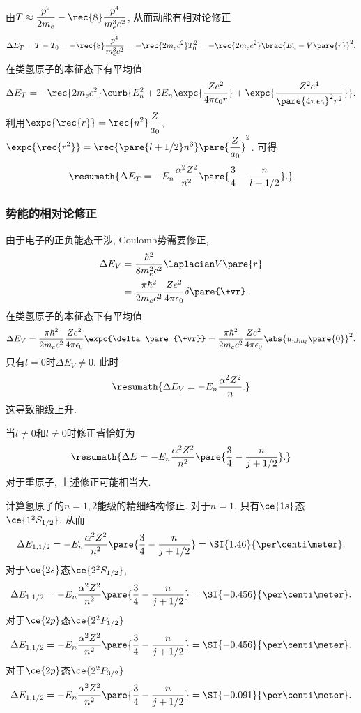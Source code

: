 \documentclass[hidelinks]{ctexart}
\begin{document}
由$\displaystyle T\approx \frac{p^2}{2m_e} - \rec{8} \frac{p^4}{m_e^3 c^2}$, 从而动能有相对论修正
\[ \Delta E_T = T - T_0 = -\rec{8}\frac{p^4}{m_e^3 c^2} = -\rec{2m_e c^2}T_0^2 = -\rec{2m_ec^2}\brac{E_n - V\pare{r}}^2. \]
在类氢原子的本征态下有平均值
\[ \Delta E_T = -\rec{2m_e c^2}\curb{E_n^2 + 2E_n \expc{\frac{Ze^2}{4\pi\epsilon_0 r}} + \expc{\frac{Z^2 e^4}{\pare{4\pi\epsilon_0}^2 r^2}}}. \]
利用$\displaystyle \expc{\rec{r}} = \rec{n^2} \frac{Z}{a_0}$, $\displaystyle \expc{\rec{r^2}} = \rec{\pare{l+1/2}n^3} \pare{\frac{Z}{a_0}}^2$. 可得
\[ \resumath{\Delta E_T = -E_n \frac{\alpha^2 Z^2}{n^2}\pare{\frac{3}{4} - \frac{n}{l+1/2}}.} \]


\subsubsection{势能的相对论修正} %
\label{ssub:势能的相对论修正}

由于电子的正负能态干涉, Coulomb势需要修正,
\begin{align*}
    \Delta E_V &= \frac{\hbar^2}{8m_e^2c^2} \laplacian V\pare{r} \\
    &= \frac{\pi \hbar^2}{2m_e c^2}\frac{Ze^2}{4\pi\epsilon_0}\delta\pare{\+vr}.
\end{align*}
在类氢原子的本征态下有平均值
\[ \Delta E_V = \frac{\pi \hbar^2}{2m_e c^2}\frac{Ze^2}{4\pi\epsilon_0}\expc{\delta\pare{\+vr}} = \frac{\pi \hbar^2}{2m_e c^2}\frac{Ze^2}{4\pi\epsilon_0}\abs{u_{nlm_l}\pare{0}}^2. \]
只有$l=0$时$\Delta E_V\neq 0$. 此时
\[ \resumath{\Delta E_V = -E_n \frac{\alpha^2 Z^2}{n}.} \]
这导致能级上升.
\par
当$l\neq 0$和$l\neq 0$时修正皆恰好为
\[ \resumath{\Delta E = -E_n \frac{\alpha^2 Z^2}{n^2}\pare{\frac{3}{4} - \frac{n}{j+1/2}}.} \]
对于重原子, 上述修正可能相当大.

\begin{sample}
    \begin{ex}
        计算氢原子的$n=1,2$能级的精细结构修正. 对于$n=1$, 只有$\ce{1s}$态$\ce{1^2S_{1/2}}$, 从而
        \[ \Delta E_{1,1/2} = -E_n \frac{\alpha^2 Z^2}{n^2} \pare{\frac{3}{4} - \frac{n}{j+1/2}} = \SI{1.46}{\per\centi\meter}. \]
        对于$\ce{2s}$态$\ce{2^2S_{1/2}}$,
        \[ \Delta E_{1,1/2} = -E_n \frac{\alpha^2 Z^2}{n^2} \pare{\frac{3}{4} - \frac{n}{j+1/2}} = \SI{-0.456}{\per\centi\meter}. \]
        对于$\ce{2p}$态$\ce{2^2P_{1/2}}$
        \[ \Delta E_{1,1/2} = -E_n \frac{\alpha^2 Z^2}{n^2} \pare{\frac{3}{4} - \frac{n}{j+1/2}} = \SI{-0.456}{\per\centi\meter}. \]
        对于$\ce{2p}$态$\ce{2^2P_{3/2}}$
        \[ \Delta E_{1,1/2} = -E_n \frac{\alpha^2 Z^2}{n^2} \pare{\frac{3}{4} - \frac{n}{j+1/2}} = \SI{-0.091}{\per\centi\meter}. \]
    \end{ex}
\end{sample}
\end{document}
